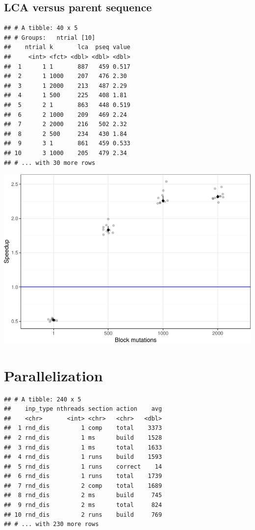 \documentclass[]{article}
\begin{document}
\subsection{LCA versus parent
sequence}\label{lca-versus-parent-sequence}

\begin{verbatim}
## # A tibble: 40 x 5
## # Groups:   ntrial [10]
##    ntrial k       lca  pseq value
##     <int> <fct> <dbl> <dbl> <dbl>
##  1      1 1       887   459 0.517
##  2      1 1000    207   476 2.30 
##  3      1 2000    213   487 2.29 
##  4      1 500     225   408 1.81 
##  5      2 1       863   448 0.519
##  6      2 1000    209   469 2.24 
##  7      2 2000    216   502 2.32 
##  8      2 500     234   430 1.84 
##  9      3 1       861   459 0.533
## 10      3 1000    205   479 2.34 
## # ... with 30 more rows
\end{verbatim}

\includegraphics{sea_2018_files/figure-latex/unnamed-chunk-2-1.pdf}

\section{Parallelization}\label{parallelization}

\begin{verbatim}
## # A tibble: 240 x 5
##    inp_type nthreads section action    avg
##    <chr>       <int> <chr>   <chr>   <dbl>
##  1 rnd_dis         1 comp    total    3373
##  2 rnd_dis         1 ms      build    1528
##  3 rnd_dis         1 ms      total    1633
##  4 rnd_dis         1 runs    build    1593
##  5 rnd_dis         1 runs    correct    14
##  6 rnd_dis         1 runs    total    1739
##  7 rnd_dis         2 comp    total    1689
##  8 rnd_dis         2 ms      build     745
##  9 rnd_dis         2 ms      total     824
## 10 rnd_dis         2 runs    build     769
## # ... with 230 more rows
\end{verbatim}
\end{document}
